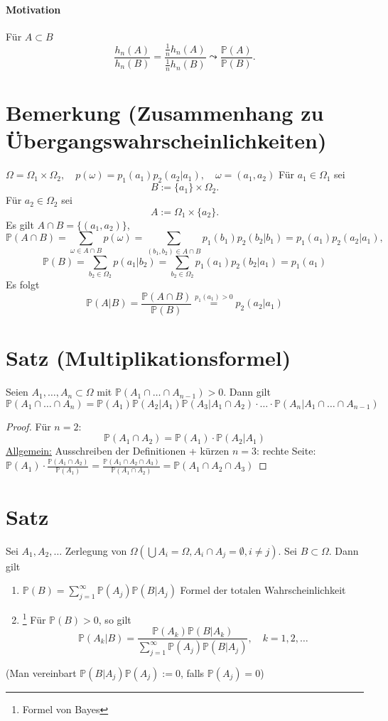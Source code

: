 \documentclass[a4paper,11pt,notitlepage]{report}
\newcommand{\Prim}{{\ensuremath{\mathbb{P}}}}
\begin{document}
\paragraph{Motivation}
Für $A \subset B$
$$\frac{h_n(A)}{h_n(B)}= \frac{\frac{1}{n}h_n(A)}{\frac{1}{n}h_n(B)} \leadsto \frac{\Prim(A)}{\Prim(B)}.$$

\section{Bemerkung (Zusammenhang zu Übergangswahrscheinlichkeiten)}
$\Omega = \Omega_1 \times \Omega_2, \quad p(\omega) = p_1(a_1)p_2(a_2|a_1), \quad \omega = (a_1,a_2)$
\newline
Für $a_1 \in \Omega_1$ sei
$$B := \{a_1\} \times \Omega_2.$$
Für $a_2 \in \Omega_2$ sei
$$A := \Omega_1 \times \{a_2\}.$$
Es gilt $A \cap B = \{(a_1,a_2)\}$,
$$\Prim(A \cap B) = \sum\limits_{\omega \in A\cap B}{p(\omega)} = \sum\limits_{(b_1,b_2) \in A \cap B}{p_1(b_1) p_2(b_2|b_1)} = p_1(a_1) p_2(a_2|a_1),$$
$$\Prim(B) = \sum\limits_{b_2 \in \Omega_2}{p(a_1|b_2)} = \sum\limits_{b_2 \in \Omega_2}{p_1(a_1) p_2(b_2|a_1)} = p_1(a_1)$$
Es folgt
$$\Prim(A|B) = \frac{\Prim(A \cap B)}{\Prim(B)} \overset{p_1(a_1)>0}{=} p_2(a_2|a_1)$$

\section{Satz (Multiplikationsformel)}
Seien $A_1, \ldots, A_n \subset \Omega$ mit $\Prim(A_1 \cap \ldots \cap A_{n-1}) > 0$.
Dann gilt
$$\Prim(A_1 \cap \ldots \cap A_n) = \Prim(A_1) \Prim(A_2|A_1) \Prim(A_3|A_1 \cap A_2) \cdot \ldots \cdot \Prim(A_n|A_1 \cap \ldots \cap A_{n-1})$$

\begin{proof}
	Für $n=2$:
		$$\Prim(A_1 \cap A_2) = \Prim(A_1) \cdot \Prim(A_2|A_1)$$
	\underline{Allgemein:} Ausschreiben der Definitionen + kürzen
	\newline
	$n=3$: rechte Seite: $\Prim(A_1) \cdot \frac{\Prim(A_1 \cap A_2)}{\Prim(A_1)} = \frac{\Prim(A_1 \cap A_2 \cap A_3)}{\Prim(A_1 \cap A_2)} = \Prim(A_1 \cap A_2 \cap A_3)$
\end{proof}

\section{Satz}
Sei $A_1, A_2, \ldots$ Zerlegung von $\Omega (\bigcup{A_i} = \Omega, A_i \cap A_j = \emptyset, i \neq j)$.
\newline
Sei $B \subset \Omega$. Dann gilt
\begin{enumerate}
	\item $\Prim(B) = \sum\limits_{j=1}^{\infty}{\Prim(A_j)\Prim(B|A_j)}$ Formel der totalen Wahrscheinlichkeit
	\item \footnote{Formel von Bayes} Für $\Prim(B)>0$, so gilt $$\Prim(A_k|B) = \frac{\Prim(A_k)\Prim(B|A_k)}{\sum\limits_{j=1}^\infty{\Prim(A_j)\Prim(B|A_j)}},\quad k=1,2,\ldots$$
\end{enumerate}
(Man vereinbart $\Prim(B|A_j)\Prim(A_j):= 0$, falls $\Prim(A_j)=0$)
\end{document}
